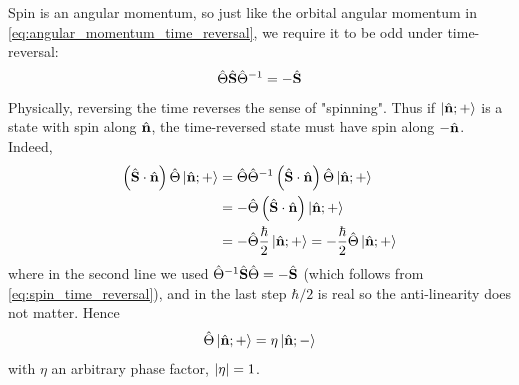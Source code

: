 Spin is an angular momentum, so just like the orbital angular momentum in \cref{eq:angular_momentum_time_reversal}, we require it to be odd under time-reversal:
\begin{align}
    \hat{\Theta} \hat{\mathbf{S}} \hat{\Theta}^{-1} = - \hat{\mathbf{S}} \label{eq:spin_time_reversal}
\end{align}
Physically, reversing the time reverses the sense of "spinning". Thus if $\ket{\hat{\mathbf{n}};+}$ is a state with spin along $\hat{\mathbf{n}}$, the time-reversed state must have spin along $-\hat{\mathbf{n}}$. Indeed,
\begin{align*}
    \left(\hat{\mathbf{S}} \cdot \hat{\mathbf{n}}\right) \hat{\Theta} \ket{\hat{\mathbf{n}};+} &= \hat{\Theta} \hat{\Theta}^{-1} \left(\hat{\mathbf{S}} \cdot \hat{\mathbf{n}}\right) \hat{\Theta} \ket{\hat{\mathbf{n}};+} \\
    &= - \hat{\Theta} \left(\hat{\mathbf{S}} \cdot \hat{\mathbf{n}}\right) \ket{\hat{\mathbf{n}};+} \\
    &= - \hat{\Theta} \frac{\hbar}{2} \ket{\hat{\mathbf{n}};+} = - \frac{\hbar}{2} \hat{\Theta} \ket{\hat{\mathbf{n}};+}
\end{align*}
where in the second line we used $\hat{\Theta}^{-1} \hat{\mathbf{S}} \hat{\Theta} = - \hat{\mathbf{S}}$ (which follows from \cref{eq:spin_time_reversal}), and in the last step $\hbar/2$ is real so the anti-linearity does not matter. Hence
\begin{align}
    \hat{\Theta} \ket{\hat{\mathbf{n}};+} = \eta \ket{\hat{\mathbf{n}};-} \label{eq:spin_n_time_reversal}
\end{align}
with $\eta$ an arbitrary phase factor, $\left| \eta \right| = 1$.

